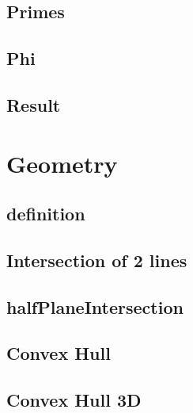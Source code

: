 \documentclass[a4paper,10pt,twocolumn,oneside]{article}
\begin{document}
\subsection{Primes}


\subsection{Phi}


\subsection{Result}


\section{Geometry}

% 

\subsection{definition}


\subsection{Intersection of 2 lines}


% 
\subsection{halfPlaneIntersection}


\subsection{Convex Hull}


\subsection{Convex Hull 3D}

\end{document}
